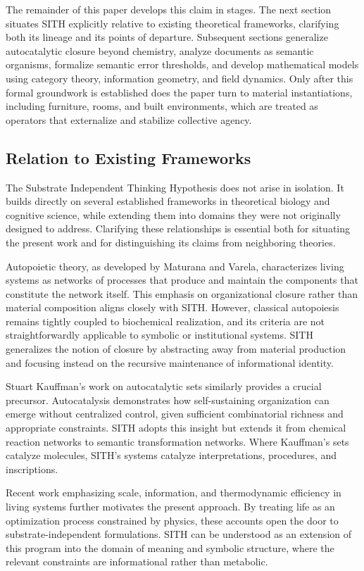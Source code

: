 \documentclass[11pt,oneside]{article}
\begin{document}
The remainder of this paper develops this claim in stages. The next section situates SITH explicitly relative to existing theoretical frameworks, clarifying both its lineage and its points of departure. Subsequent sections generalize autocatalytic closure beyond chemistry, analyze documents as semantic organisms, formalize semantic error thresholds, and develop mathematical models using category theory, information geometry, and field dynamics. Only after this formal groundwork is established does the paper turn to material instantiations, including furniture, rooms, and built environments, which are treated as operators that externalize and stabilize collective agency.

\subsection{Relation to Existing Frameworks}

The Substrate Independent Thinking Hypothesis does not arise in isolation. It builds directly on several established frameworks in theoretical biology and cognitive science, while extending them into domains they were not originally designed to address. Clarifying these relationships is essential both for situating the present work and for distinguishing its claims from neighboring theories.

Autopoietic theory, as developed by Maturana and Varela, characterizes living systems as networks of processes that produce and maintain the components that constitute the network itself. This emphasis on organizational closure rather than material composition aligns closely with SITH. However, classical autopoiesis remains tightly coupled to biochemical realization, and its criteria are not straightforwardly applicable to symbolic or institutional systems. SITH generalizes the notion of closure by abstracting away from material production and focusing instead on the recursive maintenance of informational identity.

Stuart Kauffman’s work on autocatalytic sets similarly provides a crucial precursor. Autocatalysis demonstrates how self-sustaining organization can emerge without centralized control, given sufficient combinatorial richness and appropriate constraints. SITH adopts this insight but extends it from chemical reaction networks to semantic transformation networks. Where Kauffman’s sets catalyze molecules, SITH’s systems catalyze interpretations, procedures, and inscriptions.

Recent work emphasizing scale, information, and thermodynamic efficiency in living systems further motivates the present approach. By treating life as an optimization process constrained by physics, these accounts open the door to substrate-independent formulations. SITH can be understood as an extension of this program into the domain of meaning and symbolic structure, where the relevant constraints are informational rather than metabolic.
\end{document}
